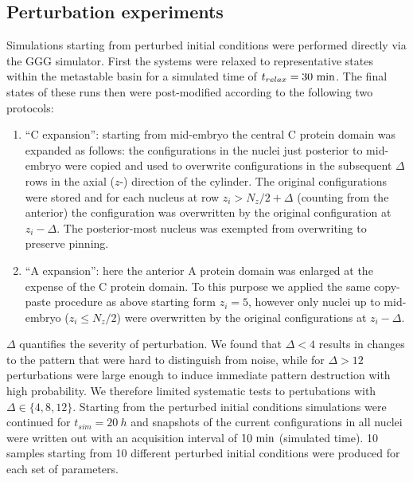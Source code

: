 \documentclass[a4paper,10pt]{article}
\newcommand{\GA}{A\xspace}
\newcommand{\GC}{C\xspace}
\newcommand{\unit}[1]{{\rm #1}}
\begin{document}
\subsection*{Perturbation experiments}
Simulations starting from perturbed initial conditions were performed directly via the GGG simulator.
First the systems were relaxed to representative states within the metastable basin for a simulated time
of $t_{relax}=30~\unit{min}$.
The final states of these runs then were post-modified according to the following two protocols:
\begin{enumerate}
 \item ``\GC expansion'': starting from mid-embryo the central \GC protein domain was expanded as follows:
	the configurations in the nuclei just posterior to mid-embryo were
	copied and used to overwrite configurations in the subsequent $\Delta$ rows in the axial 
	($z$-) direction of the cylinder. The original configurations were stored and for each nucleus at
	row $z_i > N_z/2+\Delta$ (counting from the anterior) the configuration was overwritten by 
	the original configuration at $z_i-\Delta$. The posterior-most nucleus was exempted from overwriting to preserve pinning.
 \item ``\GA expansion'': here the anterior \GA protein domain was enlarged at the expense of the \GC protein domain.
	To this purpose we applied the same copy-paste procedure as above starting form $z_i=5$,
	however only nuclei up to mid-embryo ($z_i \leq N_z/2$) were overwritten by the original configurations at $z_i-\Delta$.
\end{enumerate}
$\Delta$ quantifies the severity of perturbation. We found that $\Delta<4$ results in
changes to the pattern that were hard to distinguish from noise,
while for $\Delta > 12$ perturbations were large enough to induce immediate pattern destruction with high probability.
We therefore limited systematic tests to pertubations with $\Delta\in\lbrace 4, 8, 12 \rbrace$.
Starting from the perturbed initial conditions simulations were continued for $t_{sim}=20~h$ and
snapshots of the current configurations in all nuclei were written out with an acquisition interval 
of $10~\unit{min}$ (simulated time).
10 samples starting from 10 different perturbed initial conditions were produced for each set of parameters.
\end{document}
